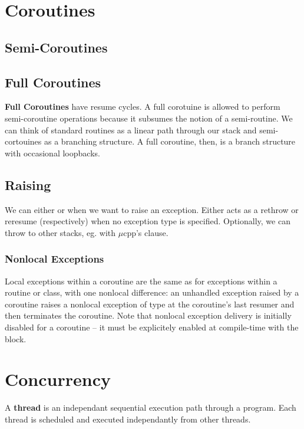 \documentclass[12pt]{article}
\begin{document}
\section{Coroutines}

\subsection{Semi-Coroutines}

\subsection{Full Coroutines}
{\bf Full Coroutines} have resume cycles. A full corotuine is allowed to perform semi-coroutine operations because it subsumes the notion of a semi-routine. We can think of standard routines as a linear path through our stack and semi-cortouines as a branching structure. A full coroutine, then, is a branch structure with occasional loopbacks.

\subsection{Raising}
We can either  or  when we want to raise an exception. Either acts as a rethrow or reresume (respectively) when no exception type is specified. Optionally, we can throw to other stacks, eg. with $\mu$cpp's  clause.

\subsubsection{Nonlocal Exceptions}
Local exceptions within a coroutine are the same as for exceptions within a routine or class, with one nonlocal difference: an unhandled exception raised by a coroutine raises a nonlocal exception of type  at the coroutine's last resumer and then terminates the coroutine. Note that nonlocal exception delivery is initially disabled for a coroutine -- it must be explicitely enabled at compile-time with the  block.

\section{Concurrency}
A {\bf thread} is an independant sequential execution path through a program. Each thread is scheduled and executed independantly from other threads.
\end{document}

